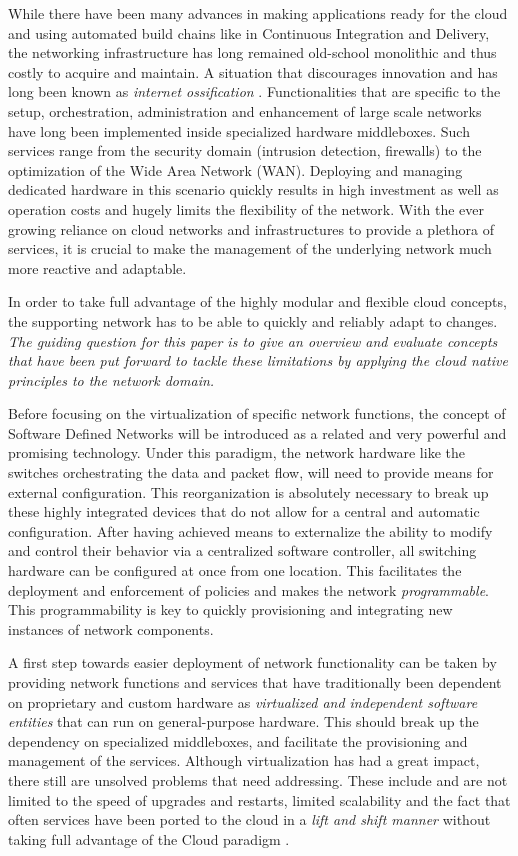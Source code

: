 While there have been many advances in making applications ready for the cloud  and using automated build chains like in Continuous Integration and Delivery,  the networking infrastructure has long remained old-school monolithic and thus costly to acquire and maintain. A situation that discourages innovation and has long been known as \textit{internet ossification} \cite{nunes2014survey}. Functionalities that are specific to the setup, orchestration, administration and enhancement of large scale networks have long been implemented inside specialized hardware middleboxes. Such services range from the security domain (intrusion detection, firewalls) to the optimization of the Wide Area Network (WAN). Deploying and managing dedicated hardware in this scenario quickly results in high investment as well as operation costs and hugely limits the flexibility of the network. With the ever growing reliance on cloud networks and infrastructures to provide a plethora of services, it is crucial to make the management of the underlying network much more reactive and adaptable. 

In order to take full advantage of the highly modular and flexible cloud concepts, the supporting network has to be able to quickly and reliably adapt to changes. \textit{The guiding question for this paper is to give an overview and evaluate concepts that have been put forward to tackle these limitations by applying the cloud native principles to the network domain.}

Before focusing on the virtualization of specific network functions, the concept of Software Defined Networks will be introduced as a related and very powerful and promising technology. Under this paradigm, the network hardware like the switches orchestrating the data and packet flow, will need to provide means for external configuration. This reorganization is absolutely necessary to break up these highly integrated devices that do not allow for a central and automatic configuration. After having achieved means to externalize the ability to modify and control their behavior via a centralized software controller, all switching hardware can be configured at once from one location. This facilitates the deployment and enforcement of policies and makes the network \textit{programmable}. This programmability is key to quickly provisioning and integrating new instances of network components. 

A first step towards easier deployment of network functionality can be taken by providing network functions  and services that have traditionally been dependent on proprietary and custom hardware as \textit{virtualized and independent software entities} that can run on general-purpose hardware. This should break up the dependency on specialized middleboxes, and facilitate the provisioning and management of the services. Although virtualization has had a great impact, there still are unsolved problems that need addressing. These include and are not limited to the speed of upgrades and restarts, limited scalability and the fact that often services have been ported to the cloud in a \textit{lift and shift manner} without taking full advantage of the Cloud paradigm \cite{CNF}.

